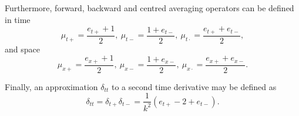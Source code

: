 Furthermore, forward, backward and centred averaging operators can be defined in time
\begin{equation}
    \mu_{t+} = \frac{e_{t+} + 1}{2}, \ \mu_{t-} = \frac{1 + e_{t-}}{2}, \ \mu_{t\cdot} = \frac{e_{t+}+e_{t-}}{2},
\end{equation}
and space
\begin{equation}
    \mu_{x+} = \frac{e_{x+} + 1}{2}, \ \mu_{x-} = \frac{1 + e_{x-}}{2}, \ \mu_{x\cdot} = \frac{e_{x+}+e_{x-}}{2}.
\end{equation}
 
Finally, an approximation $\delta_{tt}$ to a second time derivative may be defined as
\begin{equation}
    \delta_{tt} = \delta_{t+}\delta_{t-} = \frac{1}{k^2}\left(e_{t+}-2+e_{t-}\right).
\end{equation}


